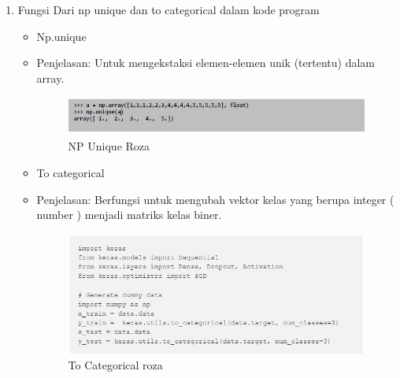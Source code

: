 \begin{enumerate}
\item Fungsi Dari np unique dan to categorical dalam kode program
\begin{itemize}
\item  Np.unique
\par 
\item Penjelasan: Untuk mengekstaksi elemen-elemen unik (tertentu) dalam array.
\begin{figure}[!hbtp]
\centering
\includegraphics[scale=0.7]{figures/npuniqueroza.jpg}
\caption{NP Unique Roza}
\label{tf-fadila}
\end{figure}
\par
\end{itemize}
\par
\begin{itemize}
\item  To categorical
\par 
\item Penjelasan: Berfungsi untuk mengubah vektor kelas yang berupa integer ( number ) menjadi matriks kelas biner.	
\begin{figure}[!hbtp]
\centering
\includegraphics[scale=0.7]{figures/tocategorical.jpg}
\caption{To Categorical roza}
\label{tf-fadila}
\end{figure}
\par
\end{itemize}
\par
\par


\end{enumerate}
